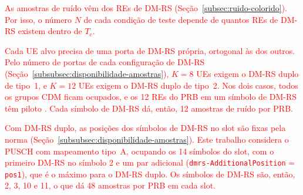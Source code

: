 



\label{subsubsec:setup_n}%
\textcolor{red}{As amostras de ruído vêm dos REs de DM-RS (Seção~\ref{subsec:ruido-colorido}). Por isso, o número $N$ de cada condição de teste depende de quantos REs de DM-RS existem dentro de $T_c$.}

\textcolor{red}{Cada UE alvo precisa de uma porta de DM-RS própria, ortogonal às dos outros. Pelo número de portas de cada configuração de DM-RS (Seção~\ref{subsubsec:disponibilidade-amostras}), $K = 8$ UEs exigem o DM-RS duplo de tipo~1, e $K = 12$ UEs exigem o DM-RS duplo de tipo~2. Nos dois casos, todos os grupos CDM ficam ocupados, e os 12 REs do PRB em um símbolo de DM-RS têm piloto \cite[Sec.~6.4.1.1.3, Tabs.~6.4.1.1.3-1 e 6.4.1.1.3-2]{3gpp-ts38211}. Cada símbolo de DM-RS dá, então, 12 amostras de ruído por PRB.}

\textcolor{red}{Com DM-RS duplo, as posições dos símbolos de DM-RS no slot são fixas pela norma (Seção~\ref{subsubsec:disponibilidade-amostras}). Este trabalho considera o PUSCH com mapeamento tipo~A, ocupando os 14 símbolos do slot, com o primeiro DM-RS no símbolo 2 e um par adicional (\texttt{dmrs-AdditionalPosition} = \texttt{pos1}), que é o máximo para o DM-RS duplo. Os símbolos de DM-RS são, então, 2, 3, 10 e 11, o que dá 48 amostras por PRB em cada slot.}

